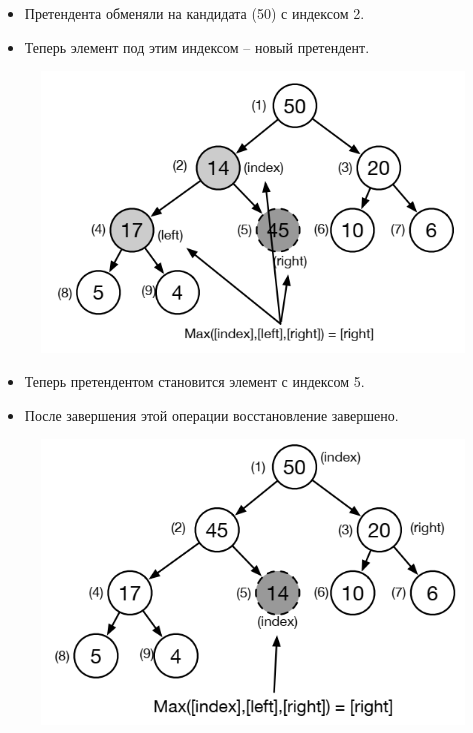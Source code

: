 \documentclass{beamer}
\begin{document}
\begin{frame}
	\begin{itemize}
		\item Претендента обменяли на кандидата (50) с индексом 2. 
		\item Теперь элемент под этим индексом -- новый претендент.
	\end{itemize}
	\begin{figure}[h]
		\centering
		\includegraphics[scale=0.5]{images/lec06-pic17.png}
	\end{figure}	
\end{frame}

\begin{frame}
	\begin{itemize}
		\item Теперь претендентом становится элемент с индексом 5. 
		\item После завершения этой операции восстановление завершено.
	\end{itemize}
	\begin{figure}[h]
		\centering
		\includegraphics[scale=0.5]{images/lec06-pic18.png}
	\end{figure}	
\end{frame}
\end{document}

